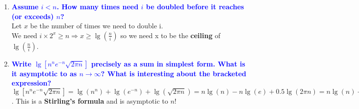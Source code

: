 \documentclass[11pt]{article}
\begin{document}
\begin{enumerate}
\begin{enumerate}
        \\ Now $\frac{\log(3)}{\log(2)} \approx 1.585$ so $\lg(n)$ is $\approx$ 1.58 times the value of $\log_3(n)$.
    \item \textbf{\textcolor{blue}{Assume $i< n$.  How many times need $i$ be doubled before it reaches (or exceeds) $n$?}}
        \\ Let $x$ be the number of times we need to double i.
        \\ We need $i \times 2^x \geq n \Rightarrow x \geq \lg(\frac{n}{i})$ so we need x to be the \textbf{ceiling} of $\lg(\frac{n}{i})$.
    \item \textbf{\textcolor{blue}{Write $\lg[n^ne^{-n}\sqrt{2\pi n}]$ precisely as a sum in simplest form.  What is it asymptotic to as $n \rightarrow \infty$?  What is interesting about the bracketed expression?}}
        \\ $\lg[n^ne^{-n}\sqrt{2\pi n}] = \lg(n^n) + \lg(e^{-n}) + \lg(\sqrt{2\pi n}) = n\lg(n) - n\lg(e) + 0.5\lg(2\pi n) = n\lg(n) - n\lg(e) + 0.5\lg(2\pi) + 0.5\lg(n)$. This is a \textbf{Stirling's formula} and is asymptotic to $n!$
    \end{enumerate}
\end{enumerate}
\end{document}
